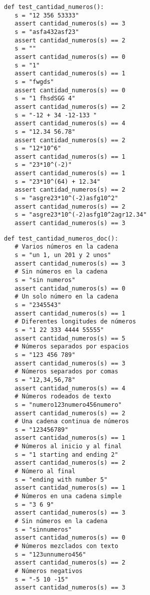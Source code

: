 \newpage
\begin{paracol}{2}
   
   \begin{lstlisting}[captionpos=b,caption={Mis pruebas para \lstinline|cantidad_numeros()|}, label={code:cantidad_numeros}]
def test_cantidad_numeros():
   s = "12 356 53333"
   assert cantidad_numeros(s) == 3
   s = "asfa432asf23"
   assert cantidad_numeros(s) == 2
   s = ""
   assert cantidad_numeros(s) == 0
   s = "1"
   assert cantidad_numeros(s) == 1
   s = "fwgds"
   assert cantidad_numeros(s) == 0
   s = "1 fhsdSGG 4"
   assert cantidad_numeros(s) == 2
   s = "-12 + 34 -12-133 "
   assert cantidad_numeros(s) == 4
   s = "12.34 56.78"
   assert cantidad_numeros(s) == 2
   s = "12*10^6"
   assert cantidad_numeros(s) == 1
   s = "23*10^(-2)"
   assert cantidad_numeros(s) == 1
   s = "23*10^(64) + 12.34"
   assert cantidad_numeros(s) == 2
   s = "asgre23*10^(-2)asfg10^2"
   assert cantidad_numeros(s) == 2
   s = "asgre23*10^(-2)asfg10^2agr12.34"
   assert cantidad_numeros(s) == 3
   \end{lstlisting}

   \switchcolumn

   \begin{lstlisting}[captionpos=b,caption={Pruebas ordenadas como estan en el documiento}, label={code:cantidad_numeros2}]
def test_cantidad_numeros_doc():
   # Varios números en la cadena
   s = "un 1, un 201 y 2 unos"   
   assert cantidad_numeros(s) == 3
   # Sin números en la cadena
   s = "sin numeros"   
   assert cantidad_numeros(s) == 0
   # Un solo número en la cadena
   s = "2345543"    
   assert cantidad_numeros(s) == 1
   # Diferentes longitudes de números
   s = "1 22 333 4444 55555"    
   assert cantidad_numeros(s) == 5
   # Números separados por espacios
   s = "123 456 789"    
   assert cantidad_numeros(s) == 3
   # Números separados por comas
   s = "12,34,56,78"    
   assert cantidad_numeros(s) == 4
   # Números rodeados de texto
   s = "numero123numero456numero"   
   assert cantidad_numeros(s) == 2
   # Una cadena continua de números
   s = "123456789"   
   assert cantidad_numeros(s) == 1
   # Números al inicio y al final
   s = "1 starting and ending 2"    
   assert cantidad_numeros(s) == 2
   # Número al final 
   s = "ending with number 5"   
   assert cantidad_numeros(s) == 1
   # Números en una cadena simple
   s = "3 6 9"   
   assert cantidad_numeros(s) == 3
   # Sin números en la cadena
   s = "sinnumeros"    
   assert cantidad_numeros(s) == 0
   # Números mezclados con texto
   s = "123unnumero456"   
   assert cantidad_numeros(s) == 2
   # Números negativos
   s = "-5 10 -15"  
   assert cantidad_numeros(s) == 3
   \end{lstlisting}
\end{paracol}

